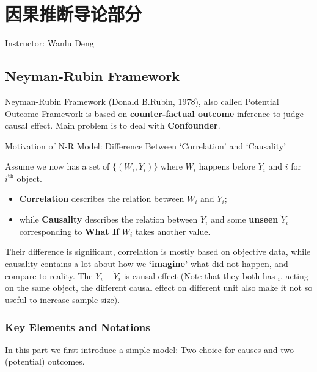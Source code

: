 \section{因果推断导论部分}\label{SecCausalInference}
\begin{center}
    Instructor: Wanlu Deng
\end{center}



\subsection{Neyman-Rubin Framework}
    Neyman-Rubin Framework (Donald B.Rubin, 1978), also called Potential Outcome Framework is based on \textbf{counter-factual outcome} inference to judge causal effect. Main problem is to deal with \textbf{Confounder}. 


\begin{point}
    Motivation of N-R Model: Difference Between `Correlation' and `Causality'
\end{point}
    
        Assume we now has a set of $ \{(W_i,Y_i)\} $ where $ W_i $ happens before $ Y_i $ and $ i $ for $ i^\mathrm{th}  $ object.
    
        \begin{itemize}[topsep=2pt,itemsep=0pt]
            \item \textbf{Correlation} describes the relation between $ W_i $ and $ Y_i $;
            \item while \textbf{Causality} describes the relation between $ Y_i $ and some \textbf{unseen}  $ \tilde{Y}_i $ corresponding to \textbf{What If } $ W_i $ takes another value.
        \end{itemize}
        
        Their difference is significant, correlation is mostly based on objective data, while causality contains a lot about how we \textbf{`imagine'} what did not happen, and compare to reality. The $ Y_i-\tilde{Y}_i $ is causal effect (Note that they both has $ _i $, acting on the same object, the different causal effect on different unit also make it not so useful to increase sample size).


    
\subsubsection{Key Elements and Notations}
        In this part we first introduce a simple model: Two choice for causes and two (potential) outcomes. 

